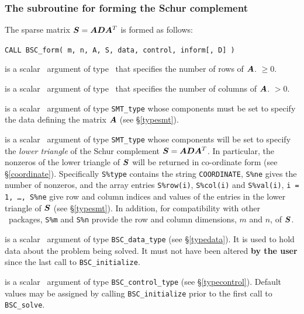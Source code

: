 \documentclass{galahad}
\newcommand{\packagename}{BSC}
\begin{document}

\subsubsection{The subroutine for forming the Schur complement}
The sparse matrix ${\bm{S}} = {\bm{A}} {\bm{D}} {\bm{A}}^T$ is formed as follows:
\vspace*{1mm}

\hspace{8mm}
{\tt CALL \packagename\_form( m, n, A, S, data, control, inform[, D] )}

\begin{description}
 is a scalar \intentin\ argument of type \integer\ that specifies
the number of rows of ${\bm{A}}$. 
 $\geq 0$.

 is a scalar \intentin\ argument of type \integer\ that specifies
the number of columns of ${\bm{A}}$.
 $> 0$.

 is a scalar \intentin\ argument of type {\tt SMT\_type} whose
components must be set to specify the data defining the matrix ${\bm{A}}$ 
(see \S\ref{typesmt}).

 is a scalar \intentout\ argument of type {\tt SMT\_type} whose
components will be set to specify the {\em lower triangle} of the 
Schur complement ${\bm{S}} = {\bm{A}} {\bm{D}} {\bm{A}}^T$. In particular, 
the nonzeros of the lower triangle of ${\bm{S}}$ will be returned
in co-ordinate form (see \S\ref{coordinate}). Specifically
{\tt S\%type} contains the string 
{\tt COORDINATE}, {\tt S\%ne} gives the number of nonzeros,
and the array entries {\tt S\%row(i)}, {\tt S\%col(i)} and 
{\tt S\%val(i)}, {\tt i = 1, \ldots, S\%ne} give row and column
indices and values of the entries in the lower triangle of ${\bm{S}}$
(see \S\ref{typesmt}). In addition, for compatibility with other
\galahad\ packages, {\tt S\%m} and {\tt S\%n} provide the row and column
dimensions, $m$ and $n$, of ${\bm{S}}$.

 is a scalar \intentinout\ argument of type 
{\tt \packagename\_data\_type}
(see \S\ref{typedata}). It is used to hold data about the problem being 
solved. It must not have been altered {\bf by the user} since the last call to 
{\tt \packagename\_initialize}.

 is a scalar \intentin\ argument of type 
{\tt \packagename\_control\_type}
(see \S\ref{typecontrol}). Default values may be assigned by calling 
{\tt \packagename\_initialize} prior to the first call to 
{\tt \packagename\_solve}.


\end{description}
\end{document}
